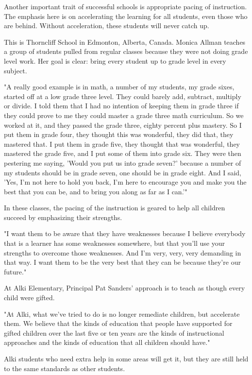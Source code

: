 Another important trait of successful schools is appropriate pacing of instruction. The emphasis here is on accelerating the learning for all students, even those who are behind. Without acceleration, these students will never catch up.

This is Thorncliff School in Edmonton, Alberta, Canada. Monica Allman teaches a group of students pulled from regular classes because they were not doing grade level work. Her goal is clear: bring every student up to grade level in every subject.

"A really good example is in math, a number of my students, my grade sixes, started off at a low grade three level. They could barely add, subtract, multiply or divide. I told them that I had no intention of keeping them in grade three if they could prove to me they could master a grade three math curriculum. So we worked at it, and they passed the grade three, eighty percent plus mastery. So I put them in grade four, they thought this was wonderful, they did that, they mastered that. I put them in grade five, they thought that was wonderful, they mastered the grade five, and I put some of them into grade six. They were then pestering me saying, 'Would you put us into grade seven?' because a number of my students should be in grade seven, one should be in grade eight. And I said, 'Yes, I'm not here to hold you back, I'm here to encourage you and make you the best that you can be, and to bring you along as far as I can.'"

In these classes, the pacing of the instruction is geared to help all children succeed by emphasizing their strengths.

"I want them to be aware that they have weaknesses because I believe everybody that is a learner has some weaknesses somewhere, but that you'll use your strengths to overcome those weaknesses. And I'm very, very, very demanding in that way. I want them to be the very best that they can be because they're our future."

At Alki Elementary, Principal Pat Sanders' approach is to teach as though every child were gifted.

"At Alki, what we've tried to do is no longer remediate children, but accelerate them. We believe that the kinds of education that people have supported for gifted children over the last five or ten years are the kinds of instructional approaches and the kinds of education that all children should have."

Alki students who need extra help in some areas will get it, but they are still held to the same standards as other students.

